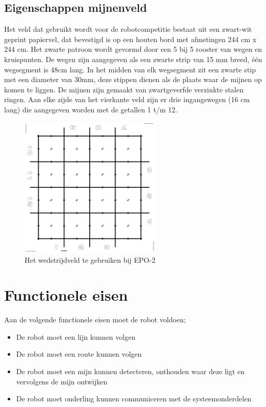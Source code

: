 \documentclass{report}
\begin{document}
\subsection{Eigenschappen mijnenveld}

Het veld dat gebruikt wordt voor de robotcompetitie bestaat uit een zwart-wit geprint papiervel, dat bevestigd is op een houten bord met afmetingen 244 cm x 244 cm.
Het zwarte patroon wordt gevormd door een 5 bij 5 rooster van wegen en kruispunten.
De wegen zijn aangegeven als een zwarte strip van 15 mm breed, één wegsegment is 48cm lang.
In het midden van elk wegsegment zit een zwarte stip met een diameter van 30mm, deze stippen dienen als de plaats waar de mijnen op komen te liggen.
De mijnen zijn gemaakt van zwartgeverfde verzinkte stalen ringen.
Aan elke zijde van het vierkante veld zijn er drie ingangswegen (16 cm lang) die aangegeven worden met de getallen 1 t/m 12.


\begin{figure}[H]
	\centering
	\includegraphics[width=0.6\textwidth]{competitionField2440x2440-rc.pdf}
	\caption{Het wedstrijdveld te gebruiken bij EPO-2}
	\label{fig:field}
\end{figure}


\section{Functionele eisen}

Aan de volgende functionele eisen moet de robot voldoen;

\begin{itemize}

\item
De robot moet een lijn kunnen volgen

\item 
De robot moet een route kunnen volgen

\item
De robot moet een mijn kunnen detecteren, onthouden waar deze ligt en vervolgens de mijn ontwijken

\item 
De robot moet onderling kunnen communiceren met de systeemonderdelen

\end{itemize}
\end{document}
